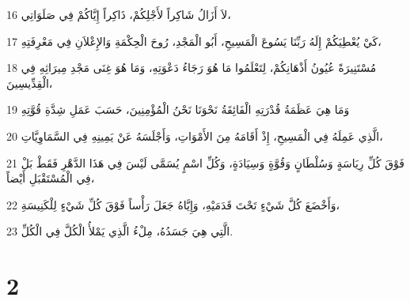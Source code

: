 \par 16 لاَ أَزَالُ شَاكِراً لأَجْلِكُمْ، ذَاكِراً إِيَّاكُمْ فِي صَلَوَاتِي،
\par 17 كَيْ يُعْطِيَكُمْ إِلَهُ رَبِّنَا يَسُوعَ الْمَسِيحِ، أَبُو الْمَجْدِ، رُوحَ الْحِكْمَةِ وَالإِعْلاَنِ فِي مَعْرِفَتِهِ،
\par 18 مُسْتَنِيرَةً عُيُونُ أَذْهَانِكُمْ، لِتَعْلَمُوا مَا هُوَ رَجَاءُ دَعْوَتِهِ، وَمَا هُوَ غِنَى مَجْدِ مِيرَاثِهِ فِي الْقِدِّيسِينَ،
\par 19 وَمَا هِيَ عَظَمَةُ قُدْرَتِهِ الْفَائِقَةُ نَحْوَنَا نَحْنُ الْمُؤْمِنِينَ، حَسَبَ عَمَلِ شِدَّةِ قُوَّتِهِ
\par 20 الَّذِي عَمِلَهُ فِي الْمَسِيحِ، إِذْ أَقَامَهُ مِنَ الأَمْوَاتِ، وَأَجْلَسَهُ عَنْ يَمِينِهِ فِي السَّمَاوِيَّاتِ،
\par 21 فَوْقَ كُلِّ رِيَاسَةٍ وَسُلْطَانٍ وَقُوَّةٍ وَسِيَادَةٍ، وَكُلِّ اسْمٍ يُسَمَّى لَيْسَ فِي هَذَا الدَّهْرِ فَقَطْ بَلْ فِي الْمُسْتَقْبَلِ أَيْضاً،
\par 22 وَأَخْضَعَ كُلَّ شَيْءٍ تَحْتَ قَدَمَيْهِ، وَإِيَّاهُ جَعَلَ رَأْساً فَوْقَ كُلِّ شَيْءٍ لِلْكَنِيسَةِ،
\par 23 الَّتِي هِيَ جَسَدُهُ، مِلْءُ الَّذِي يَمْلأُ الْكُلَّ فِي الْكُلِّ.

\chapter{2}

